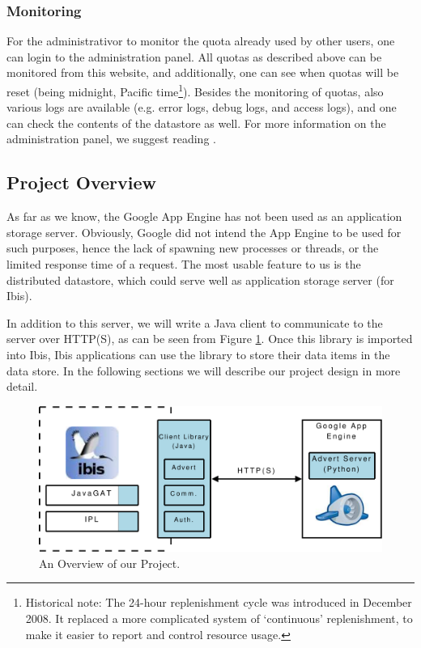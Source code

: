 \subsubsection{Monitoring}
For the administrativor to monitor the quota already used by other users, one can
login to the administration panel. All quotas as described above can be monitored
from this website, and additionally, one can see when quotas will be reset (being
midnight, Pacific time\footnote{Historical note: The 24-hour replenishment cycle
was introduced in December 2008. It replaced a more complicated system of
`continuous' replenishment, to make it easier to report and control resource
usage.}).  Besides the monitoring of quotas, also various logs are available
(e.g. error logs, debug logs, and access logs), and one can check the contents of
the datastore as well. For more information on the administration panel, we
suggest reading \cite{app-engine-admin}.

\subsection{Project Overview}
As far as we know, the Google App Engine has not been used as an application
storage server. Obviously, Google did not intend the App Engine to be used for
such purposes, hence the lack of spawning new processes or threads, or the
limited response time of a request. The most usable feature to us is the
distributed datastore, which could serve well as application storage
server (for Ibis). 

In addition to this server, we will write a Java client to communicate to the
server over HTTP(S), as can be seen from Figure \ref{related-overview}. Once
this library is imported into Ibis, Ibis applications can use the
library to store their data items in the data store. In the following sections
we will describe our project design in more detail.

\begin{figure}[ht] %
\begin{center}
\includegraphics[width=14cm]{./figures/project_design.pdf} 
\caption{An Overview of our Project.\label{related-overview}}
\end{center}
\end{figure}
